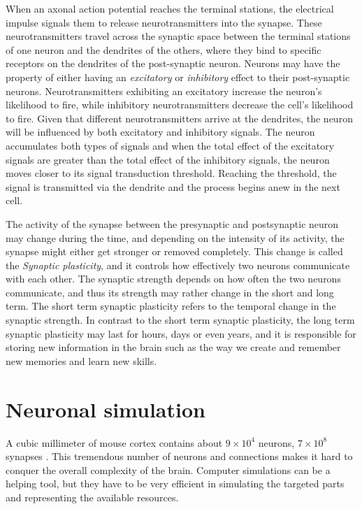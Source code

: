When an axonal action potential reaches the terminal stations, the electrical impulse signals them to release neurotransmitters into the synapse. These neurotransmitters travel across the synaptic space between the terminal stations of one neuron and the dendrites of the others, where they bind to specific receptors on the dendrites of the post-synaptic neuron. Neurons may have the property of either having an \emph{excitatory} or \emph{inhibitory} effect to their post-synaptic neurons. Neurotransmitters exhibiting an excitatory increase the neuron's likelihood to fire, while inhibitory neurotransmitters decrease the cell's likelihood to fire. Given that different neurotransmitters arrive at the dendrites, the neuron will be influenced by both excitatory and inhibitory signals. The neuron accumulates both types of signals and when the total effect of the excitatory signals are greater than the total effect of the inhibitory signals, the neuron moves closer to its signal transduction threshold. Reaching the threshold, the signal is transmitted via the dendrite and the process begins anew in the next cell.

The activity of the synapse between the presynaptic and postsynaptic neuron may change during the time, and depending on the intensity of its activity, the synapse might either get stronger or removed completely. This change is called the \emph{ Synaptic plasticity}, and it controls how effectively two neurons communicate with each other. The synaptic strength depends on how often the two neurons communicate, and thus its strength  may rather change in the short and long term. The short term synaptic plasticity refers to the temporal change in the synaptic strength. In contrast to the short term synaptic plasticity, the long term synaptic plasticity may last for hours, days or even years, and it is responsible for storing new information in the brain such as the way we create and remember new memories and learn new skills.


\section{Neuronal simulation}

A cubic millimeter of mouse cortex contains about $9×10^4$ neurons, $7×10^8$ synapses \citep{faisal2005ion}. This tremendous number of neurons and connections makes it hard to conquer the overall complexity of the brain. Computer simulations can be a helping tool, but they have to be very efficient  in simulating the targeted parts and representing the available resources.

